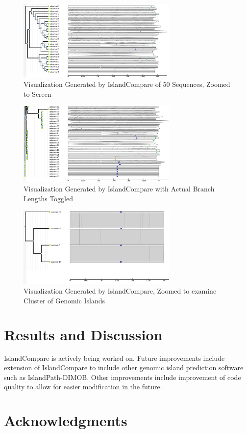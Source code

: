 		\begin{figure}[h]
			\centering
			\includegraphics[width=0.7\textwidth]{IslandCompare}
			\caption{\label{fig:islandcompare} Visualization Generated by IslandCompare of 50 Sequences, Zoomed to Screen}
		\end{figure}
	
		\begin{figure}[h]
			\centering
			\includegraphics[width=0.7\textwidth]{IslandCompareToggleBranches}
			\caption{\label{fig:islandcomparetogglebranches} Visualization Generated by IslandCompare with Actual Branch Lengths Toggled}
		\end{figure}
	
		\begin{figure}[h]
			\centering
			\includegraphics[width=0.7\textwidth]{IslandCompareZoom}
			\caption{\label{fig:islandcomparezoom} Visualization Generated by IslandCompare, Zoomed to examine Cluster of Genomic Islands}
		\end{figure}

	\section{Results and Discussion}
		IslandCompare is actively being worked on. Future improvements include extension of IslandCompare to include other genomic island prediction software such as IslandPath-DIMOB. Other improvements include improvement of code quality to allow for easier modification in the future.

	\section{Acknowledgments}

	\clearpage
	
	

